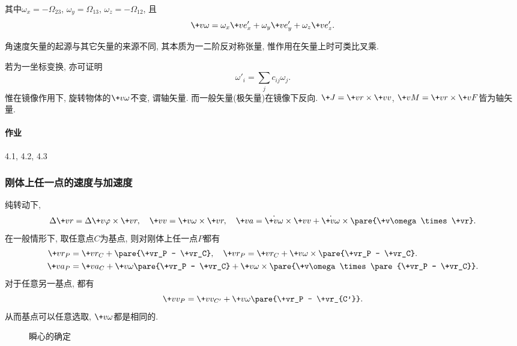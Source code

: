 \documentclass[../LectureNotes.tex]{subfiles}
\begin{document}
其中$\omega_x = -\Omega_{23}$, $\omega_y = \Omega_{13}$, $\omega_z = -\Omega_{12}$, 且
\[ \+v\omega = \omega_x \+ve'_x + \omega_y \+ve'_y + \omega_z \+ve'_z. \]
\begin{remark}
    角速度矢量的起源与其它矢量的来源不同, 其本质为一二阶反对称张量, 惟作用在矢量上时可类比叉乘.
\end{remark}
若为一坐标变换, 亦可证明
\[ \omega'_i = \sum_j c_{ij}\omega_j. \]
惟在镜像作用下, 旋转物体的$\+v\omega$不变, 谓轴矢量. 而一般矢量(极矢量)在镜像下反向. $\+J = \+vr\times\+vv$, $\+vM = \+vr\times\+vF$皆为轴矢量.


\paragraph{作业} %
\label{par:作业}

4.1, 4.2, 4.3



\subsubsection{刚体上任一点的速度与加速度} %
\label{ssub:刚体上任一点的速度与加速度}

纯转动下, 
\[ \Delta \+vr = \Delta\+v\varphi \times\+vr,\quad \+vv = \+v\omega\times\+vr,\quad \+va = \dot{\+v\omega}\times\+vv + \dot{\+v\omega}\times\pare{\+v\omega\times\+vr}. \]
在一般情形下, 取任意点$C$为基点, 则对刚体上任一点$P$都有
\begin{align*}
    \+vr_P &= \+vr_C + \pare{\+vr_P - \+vr_C},\quad \+vr_P = \+vr_C + \+v\omega\times\pare{\+vr_P - \+vr_C}. \\
    \+va_P &= \+va_C + \+v\omega\pare{\+vr_P - \+vr_C} + \+v\omega\times\pare{\+v\omega\times\pare{\+vr_P - \+vr_C}}.
\end{align*}
对于任意另一基点, 都有
\[ \+vv_P = \+vv_{C'} + \+v\omega\pare{\+vr_P - \+vr_{C'}}. \]
从而基点可以任意选取, $\+v\omega$都是相同的.

\begin{figure}[htb]
    \centering
    \begin{subfigure}{5cm}
        \centering
    \end{subfigure}
    \begin{subfigure}{5cm}
        \centering
    \end{subfigure}
    \caption{瞬心的确定}
\end{figure}
\end{document}
